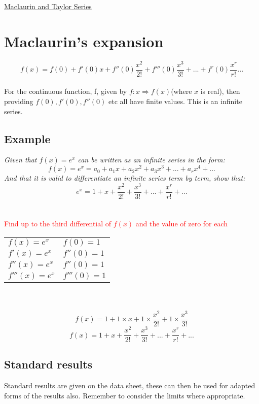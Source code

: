 \documentclass{article}[18pt]
\begin{document}
\begin{center}
\underline{\huge Maclaurin and Taylor Series}
\end{center}
\section{Maclaurin's expansion}
$$f(x)=f(0)+f'(0)x+f''(0)\frac{x^2}{2!}+f'''(0)\frac{x^3}{3!}+...+f^r(0)\frac{x^r}{r!}...$$
\\
For the continuous function, f, given by $f:x\Rightarrow f(x)$(where $x$ is real), then providing $f(0),f'(0),f''(0)$ etc all have finite values. This is an infinite series.
\subsection{Example}
\textit{Given that $f(x)=e^x$ can be written as an infinite series in the form:}
$$f(x)=e^x=a_0+a_1x+a_2x^2+a_3x^3+...+a_rx^4+...$$
\textit{And that it is valid to differentiate an infinite series term by term, show that:}
$$e^x=1+x+\frac{x^2}{2!}+\frac{x^3}{3!}+...+\frac{x^r}{r!}+...$$
\\
\\
\textcolor{red}{Find up to the third differential of $f(x)$ and the value of zero for each}\\
\begin{tabular}{l l}
$f(x)=e^x$&$f(0)=1$\\
$f'(x)=e^x$&$f''(0)=1$\\
$f''(x)=e^x$&$f''(0)=1$\\
$f'''(x)=e^x$&$f'''(0)=1$
\end{tabular}
\\
\\
$$f(x)=1+1\times x+1\times\frac{x^2}{2!}+1\times\frac{x^3}{3!}$$
$$f(x)=1+x+\frac{x^2}{2!}+\frac{x^3}{3!}+...+\frac{x^r}{r!}+...$$
\subsection{Standard results}
Standard results are given on the data sheet, these can then be used for adapted forms of the results also. Remember to consider the limits where appropriate.
\newpage
\end{document}
